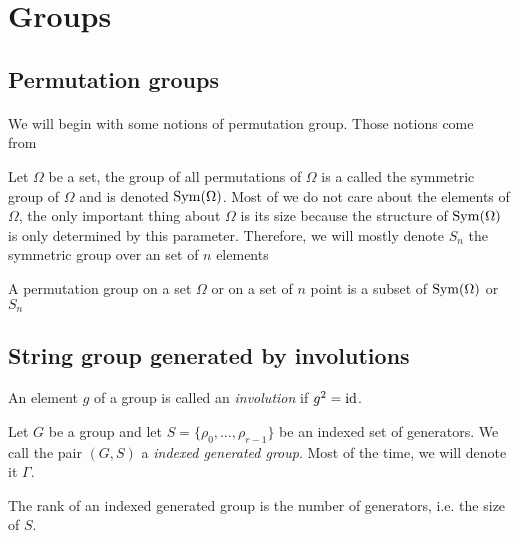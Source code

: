 \section{Groups}

\subsection{Permutation groups}

\paragraph{}
We will begin with some notions of permutation group. Those notions come from~\cite{cameronPermutationGroups}

\begin{definition}
  Let $\Omega$ be a set, the group of all permutations of $\Omega$ is a called the symmetric group of $\Omega$ and is denoted $\operatorname{Sym}(\Omega)$. Most of we do not care about the elements of $\Omega$, the only important thing about $\Omega$ is its size because the structure of $\operatorname{Sym}(\Omega)$ is only determined by this parameter. Therefore, we will mostly denote $S_n$ the symmetric group over an set of $n$ elements
\end{definition}

\begin{definition}
  A permutation group on a set $\Omega$ or on a set of $n$ point is a subset of $\operatorname{Sym}(\Omega)$ or $S_n$
\end{definition}

\subsection{String group generated by involutions}

\begin{definition}[Involution]
  An element $g$ of a group is called an \textit{involution} if $g^2 = \operatorname{id}$.
\end{definition}

\begin{definition}
  Let $G$ be a group and let $S = \{\rho_0, \dots, \rho_{r-1}\}$ be an indexed set of generators.
  We call the pair $(G,S)$ a \textit{indexed generated group}. Most of the time, we will denote it $\Gamma$.
\end{definition}

\begin{definition}
  The rank of an indexed generated group is the number of generators, i.e. the size of $S$.
\end{definition}

